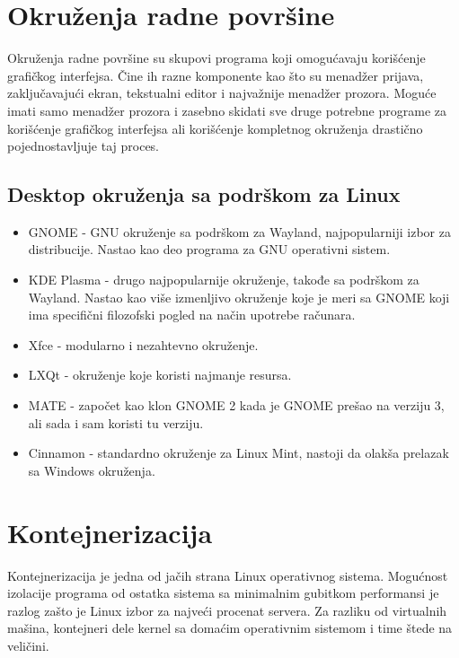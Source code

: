 \documentclass[a4paper,14pt]{article}
\begin{document}
\section{Okruženja radne površine}
Okruženja radne površine su skupovi programa koji omogućavaju korišćenje grafičkog interfejsa. Čine ih razne komponente kao što su menadžer prijava, zaključavajući ekran, tekstualni editor i najvažnije menadžer prozora. Moguće imati samo menadžer prozora i zasebno skidati sve druge potrebne programe za korišćenje grafičkog interfejsa ali korišćenje kompletnog okruženja drastično pojednostavljuje taj proces.
\subsection{Desktop okruženja sa podrškom za Linux}
\begin{itemize}
\item GNOME\cite{gnome} - GNU okruženje sa podrškom za Wayland, najpopularniji izbor za distribucije. Nastao kao deo programa za GNU operativni sistem.
\item KDE Plasma\cite{kdeplasma}  - drugo najpopularnije okruženje, takođe sa podrškom za Wayland. Nastao kao više izmenljivo okruženje koje je meri sa GNOME koji ima specifični filozofski pogled na način upotrebe računara.
\item Xfce\cite{xfce} - modularno i nezahtevno okruženje.
\item LXQt\cite{lxqt} - okruženje koje koristi najmanje resursa.
\item MATE\cite{mate} - započet kao klon GNOME 2 kada je GNOME prešao na verziju 3, ali sada i sam koristi tu verziju.
\item Cinnamon\cite{cinnamon} - standardno okruženje za Linux Mint, nastoji da olakša prelazak sa Windows okruženja.
\end{itemize}
\newpage

\section{Kontejnerizacija}
Kontejnerizacija je jedna od jačih strana Linux operativnog sistema. Mogućnost izolacije programa od ostatka sistema sa minimalnim gubitkom performansi je razlog zašto je Linux izbor za najveći procenat servera. Za razliku od virtualnih mašina, kontejneri dele kernel sa domaćim operativnim sistemom i time štede na veličini.
\end{document}

